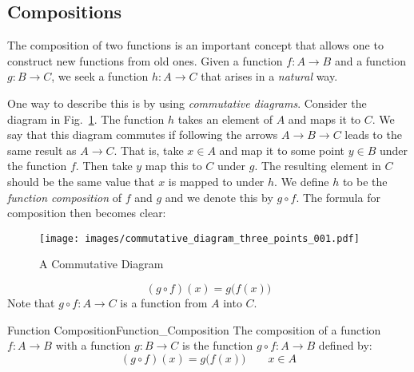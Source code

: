     \subsection{Compositions}
        The composition of two functions is an important concept that allows
        one to construct new functions from old ones. Given a function
        $f:A\rightarrow{B}$ and a function $g:B\rightarrow{C}$, we seek a
        function $h:A\rightarrow{C}$ that arises in a \textit{natural} way.
        \par\hfill\par
        \begin{minipage}[lt]{0.6\textwidth}
            One way to describe this is by using
            \textit{commutative diagrams}. Consider
            the diagram in Fig.~\ref{fig:Commutative_Diagram_Func_Comp}. The
            function $h$ takes an element of $A$ and maps it to $C$. We say that
            this diagram commutes if following the arrows
            $A\rightarrow{B}\rightarrow{C}$ leads to the same result as
            $A\rightarrow{C}$. That is, take $x\in{A}$ and map it to some point
            $y\in{B}$ under the function $f$. Then take $y$ map this to $C$
            under $g$. The resulting element in $C$ should be the same value
            that $x$ is mapped to under $h$. We define $h$ to be the
            \textit{function composition} of $f$ and
            $g$ and we denote this by $g\circ{f}$. The formula for composition
            then becomes clear:
        \end{minipage}
        \hfill
        \begin{minipage}[rt]{0.35\textwidth}
            \centering
            \begin{figure}[H]
                \centering
                \captionsetup{type=figure}
                \texttt{[image: images/commutative\_diagram\_three\_points\_001.pdf]}
                \caption{A Commutative Diagram}
                \label{fig:Commutative_Diagram_Func_Comp}
            \end{figure}
        \end{minipage}
        \begin{equation}
            (g\circ{f})(x)=g\big(f(x)\big)
        \end{equation}
        Note that $g\circ{f}:A\rightarrow{C}$ is a function from $A$ into $C$.
        \begin{fdefinition}{Function Composition}{Function_Composition}
            The composition of a function $f:A\rightarrow{B}$ with a function
            $g:B\rightarrow{C}$ is the function $g\circ{f}:A\rightarrow{B}$
            defined by:
            \begin{equation*}
                (g\circ{f})(x)=g\big(f(x)\big)
                \quad\quad
                x\in{A}
            \end{equation*}
        \end{fdefinition}
